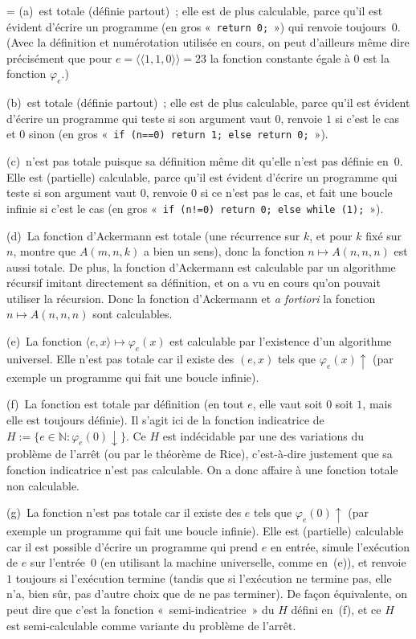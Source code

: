 \documentclass[12pt,a4paper]{article}
\theoremstyle{definition}
\newcommand{\dbllangle}{\mathopen{\langle\!\langle}}
\newcommand{\dblrangle}{\mathclose{\rangle\!\rangle}}
\newif\ifcorrige
\newenvironment{corrige}%
{\ifcorrige\relax\else\setbox0=\vbox\bgroup\fi%
\smallbreak\footnotesize\noindent{\underbar{\textit{Corrigé.}}\quad}}
{{\hbox{}\nobreak\hfill\checkmark}%
\ifcorrige\relax\else\egroup\fi\par}
\begin{document}
\begin{corrige}
(a) est totale (définie partout) ; elle est de plus calculable, parce
  qu'il est évident d'écrire un programme (en gros « \texttt{return
    0;} ») qui renvoie toujours $0$.  (Avec la définition et
  numérotation utilisée en cours, on peut d'ailleurs même dire
  précisément que pour $e = \dbllangle 1,1,0\dblrangle = 23$ la
  fonction constante égale à $0$ est la fonction $\varphi_e$.)

(b) est totale (définie partout) ; elle est de plus calculable, parce
  qu'il est évident d'écrire un programme qui teste si son argument
  vaut $0$, renvoie $1$ si c'est le cas et $0$ sinon (en gros
  « \texttt{if (n==0) return 1; else return 0;} »).

(c) n'est pas totale puisque sa définition même dit qu'elle n'est pas
  définie en $0$.  Elle est (partielle) calculable, parce qu'il est
  évident d'écrire un programme qui teste si son argument vaut $0$,
  renvoie $0$ si ce n'est pas le cas, et fait une boucle infinie si
  c'est le cas (en gros « \texttt{if (n!=0) return 0; else while
    (1);} »).

(d) La fonction d'Ackermann est totale (une récurrence sur $k$, et
  pour $k$ fixé sur $n$, montre que $A(m,n,k)$ a bien un sens), donc
  la fonction $n \mapsto A(n,n,n)$ est aussi totale.  De plus, la
  fonction d'Ackermann est calculable par un algorithme récursif
  imitant directement sa définition, et on a vu en cours qu'on pouvait
  utiliser la récursion.  Donc la fonction d'Ackermann et \textit{a
    fortiori} la fonction $n \mapsto A(n,n,n)$ sont calculables.

(e) La fonction $\langle e,x\rangle \mapsto \varphi_e(x)$ est
  calculable par l'existence d'un algorithme universel.  Elle n'est
  pas totale car il existe des $(e,x)$ tels que $\varphi_e(x)\uparrow$
  (par exemple un programme qui fait une boucle infinie).

(f) La fonction est totale par définition (en tout $e$, elle vaut soit
  $0$ soit $1$, mais elle est toujours définie).  Il s'agit ici de la
  fonction indicatrice de $H := \{e \in \mathbb{N} :
  \varphi_e(0)\downarrow\}$.  Ce $H$ est indécidable par une des
  variations du problème de l'arrêt (ou par le théorème de Rice),
  c'est-à-dire justement que sa fonction indicatrice n'est pas
  calculable.  On a donc affaire à une fonction totale non calculable.

(g) La fonction n'est pas totale car il existe des $e$ tels que
  $\varphi_e(0)\uparrow$ (par exemple un programme qui fait une boucle
  infinie).  Elle est (partielle) calculable car il est possible
  d'écrire un programme qui prend $e$ en entrée, simule l'exécution de
  $e$ sur l'entrée $0$ (en utilisant la machine universelle, comme
  en (e)), et renvoie $1$ toujours si l'exécution termine (tandis que
  si l'exécution ne termine pas, elle n'a, bien sûr, pas d'autre choix
  que de ne pas terminer).  De façon équivalente, on peut dire que
  c'est la fonction « semi-indicatrice » du $H$ défini en (f), et ce
  $H$ est semi-calculable comme variante du problème de l'arrêt.


\end{corrige}
\end{document}
